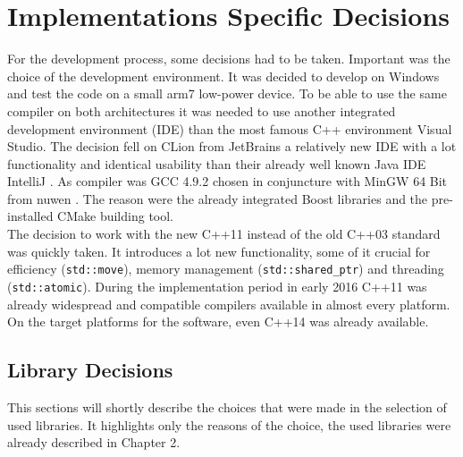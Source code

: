 \section{Implementations Specific Decisions}
For the development process, some decisions had to be taken. Important was the choice of the development environment. It was decided to develop on Windows and test the code on a small arm7 low-power device. To be able to use the same compiler on both architectures it was needed to use another integrated development environment (IDE) than the most famous C++ environment Visual Studio. The decision fell on CLion from JetBrains \cite{clion} a relatively new IDE with a lot functionality and identical usability than their already well known Java IDE IntelliJ \cite{intellij}. As compiler was GCC 4.9.2 chosen in conjuncture with MinGW 64 Bit from nuwen \cite{mingw}. The reason were the already integrated Boost libraries and the pre-installed CMake building tool.\\
The decision to work with the new C++11 instead of the old C++03 standard was quickly taken. It introduces a lot new functionality, some of it crucial for efficiency (\texttt{std::move}), memory management (\texttt{std::shared\_ptr}) and threading (\texttt{std::atomic}). During the implementation period in early 2016 C++11 was already widespread and compatible compilers available in almost every platform. On the target platforms for the software, even C++14 was already available.
\subsection{Library Decisions}
This sections will shortly describe the choices that were made in the selection of used libraries. It highlights only the reasons of the choice, the used libraries were already described in Chapter 2.

